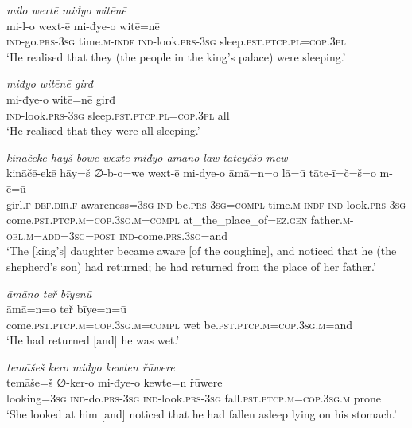 \ea \label{KŠ.61}
\textit{milo wextē miđyo witēnē} \\ 
\gll mi-l-o wext-ē mi-đye-o witē=nē \\ 
 \textsc{ind-}go\textsc{.prs}\textsc{-3sg} time\textsc{.m}\textsc{-indf} \textsc{ind-}look\textsc{.prs}\textsc{-3sg} sleep\textsc{.pst}\textsc{.ptcp}\textsc{.pl}\textsc{=cop}\textsc{.3pl} \\ 
\glt `He realised that they (the people in the king’s palace) were sleeping.'
\z 
 
\ea \label{KŠ.62}
\textit{miđyo witēnē girđ} \\ 
\gll mi-đye-o witē=nē girđ \\ 
 \textsc{ind-}look\textsc{.prs}\textsc{-3sg} sleep\textsc{.pst}\textsc{.ptcp}\textsc{.pl}\textsc{=cop}\textsc{.3pl} all \\ 
\glt `He realised that they were all  sleeping.'
\z 
 
\ea \label{KŠ.65}
\textit{kināčekē hāyš bowe wextē miđyo āmāno lāw tāteyčšo mēw} \\ 
\gll kināčē-ekē hāy=š ∅-b-o=we wext-ē mi-đye-o āmā=n=o lā=ū tāte-ī=č=š=o m-ē=ū \\ 
 girl\textsc{.f}\textsc{-def}\textsc{.dir}\textsc{.f} awareness\textsc{=3sg} \textsc{ind-}be\textsc{.prs}\textsc{-3sg}\textsc{=compl} time\textsc{.m}\textsc{-indf} \textsc{ind-}look\textsc{.prs}\textsc{-3sg} come\textsc{.pst}\textsc{.ptcp}\textsc{.m}\textsc{=cop}\textsc{.3sg}\textsc{.m}\textsc{=compl} at\_the\_place\_of\textsc{\textsc{=ez.gen}} father\textsc{.m}\textsc{-obl}\textsc{.m}\textsc{=add}\textsc{=3sg}\textsc{=\textsc{post}} \textsc{ind-}come\textsc{.prs}\textsc{.3sg}=and \\ 
\glt `The [king’s] daughter became aware [of the coughing], and noticed that he (the shepherd’s son) had returned; he had returned from the place of her father.'
\z 
 
\ea \label{KŠ.66}
\textit{āmāno teř bīyenū} \\ 
\gll āmā=n=o teř bīye=n=ū \\ 
 come\textsc{.pst}\textsc{.ptcp}\textsc{.m}\textsc{=cop}\textsc{.3sg}\textsc{.m}\textsc{=compl} wet be\textsc{.pst}\textsc{.ptcp}\textsc{.m}\textsc{=cop}\textsc{.3sg}\textsc{.m}=and \\ 
\glt `He had returned [and] he was wet.'
\z 
 
\ea \label{KŠ.67}
\textit{temāšeš kero miđyo kewten řūwere} \\ 
\gll temāše=š ∅-ker-o mi-đye-o kewte=n řūwere \\ 
 looking\textsc{=3sg} \textsc{ind-}do\textsc{.prs}\textsc{-3sg} \textsc{ind-}look\textsc{.prs}\textsc{-3sg} fall\textsc{.pst}\textsc{.ptcp}\textsc{.m}\textsc{=cop}\textsc{.3sg}\textsc{.m} prone \\ 
\glt `She looked at him [and] noticed that he had fallen asleep lying on his stomach.'
\z 
 
